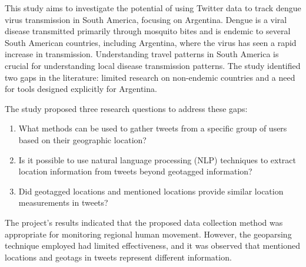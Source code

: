 This study aims to investigate the potential of using Twitter data to track dengue virus transmission in South America, focusing on Argentina. Dengue is a viral disease transmitted primarily through mosquito bites and is endemic to several South American countries, including Argentina, where the virus has seen a rapid increase in transmission. Understanding travel patterns in South America is crucial for understanding local disease transmission patterns. The study identified two gaps in the literature: limited research on non-endemic countries and a need for tools designed explicitly for Argentina.

The study proposed three research questions to address these gaps:
\begin{enumerate}
    \item What methods can be used to gather tweets from a specific group of users based on their geographic location?
    \item Is it possible to use natural language processing (NLP) techniques to extract location information from tweets beyond geotagged information?
    \item Did geotagged locations and mentioned locations provide similar location measurements in tweets?
\end{enumerate}

The project's results indicated that the proposed data collection method was appropriate for monitoring regional human movement. However, the geoparsing technique employed had limited effectiveness, and it was observed that mentioned locations and geotags in tweets represent different information.